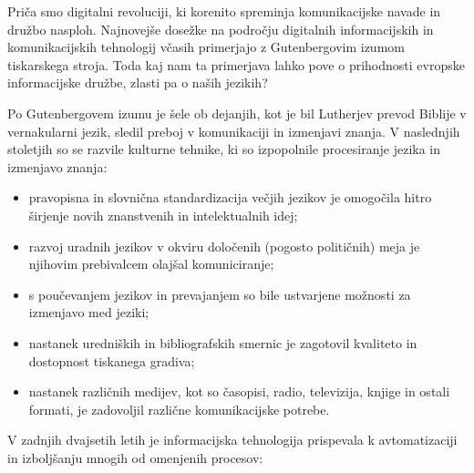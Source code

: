 \clearpage



\begin{multicols}{2}

Priča smo digitalni revoluciji, ki korenito spre\-minja komunikacij\-ske navade in družbo nasploh. Naj\-novejše dosežke na področju digitalnih informacij\-skih in komunikacij\-skih tehnologij včasih primerjajo z Gutenbergovim izumom tiskarskega stroja. Toda kaj nam ta primerjava lahko pove o prihodnosti evropske informacij\-ske družbe, zlasti pa o naših jezikih?


Po Gutenbergovem izumu je šele ob dejanjih, kot je bil Lutherjev prevod Biblije v vernakularni jezik, sledil preboj v komunikaciji in izmenjavi znanja. V naslednjih stoletjih so se razvile kulturne tehnike, ki so izpopolnile procesiranje jezika in izmenjavo znanja:

\begin{itemize}
\item pravopisna in slovnična standardizacija večjih jezikov je omogočila hitro širjenje novih znanstvenih in intelektualnih idej;
\item razvoj uradnih jezikov v okviru določenih (pogosto političnih) meja je njihovim prebivalcem olajšal komuniciranje;
\item s poučevanjem jezikov in prevajanjem so bile ustvarjene možnosti za izmenjavo med jeziki;
\item nastanek uredniških in bibliografskih smernic je zagotovil kvaliteto in dostopnost tiskanega gradiva;
\item nastanek različnih medijev, kot so časopisi, radio, televizija, knjige in ostali formati, je zadovoljil različne komunikacij\-ske potrebe.
\end{itemize}

V zadnjih dvajsetih letih je informacij\-ska tehnologija prispevala k avtomatizaciji in izboljšanju mnogih od omenjenih procesov:


\end{multicols}
